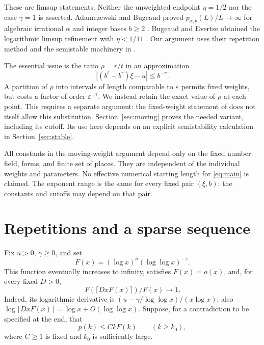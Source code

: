 \documentclass[11pt]{article}
\numberwithin{equation}{section}
\theoremstyle{remark}\newtheorem{remark}[theorem]{Remark}
\newcommand{\eps}{\varepsilon}\newcommand{\LL}{\mathcal L}
\begin{document}
These are limsup statements. Neither the unweighted endpoint
$\eta=1/2$ nor the case $\gamma=1$ is asserted.
Adamczewski and Bugeaud proved $p_{\alpha,b}(L)/L\to\infty$ for algebraic
irrational $\alpha$ and integer bases $b\ge2$ \cite{AB07}.
Bugeaud and Evertse obtained the logarithmic limsup refinement with
$\eta<1/11$ \cite[Theorem~2.1]{BE08}. Our argument uses their
repetition method and the semistable machinery in \cite[Sections~8--14]{EF13}.

The essential issue is the ratio $\rho=r/t$ in an approximation
\[
 |(b^t-b^r)\xi-a|\le b^{-v}.
\]
A partition of $\rho$ into intervals of length comparable to $\eps$
permits fixed weights, but costs a factor of order $\eps^{-1}$.
We instead retain the exact value of $\rho$ at each point. This requires
a separate argument: the fixed-weight statement of
\cite[Theorem~8.1]{EF13} does not itself allow this substitution.
Section~\ref{sec:moving} proves the needed variant, including its cutoff.
Its use here depends on an explicit semistability calculation in
Section~\ref{sec:stable}.

All constants in the moving-weight argument depend only on the fixed
number field, forms, and finite set of places. They are independent of
the individual weights and parameters. No effective numerical starting
length for \eqref{eq:main} is claimed. The exponent range is the same
for every fixed pair $(\xi,b)$; the constants and cutoffs may depend
on that pair.

\section{Repetitions and a sparse sequence}\label{sec:words}
Fix $u>0$, $\gamma\ge0$, and set
\[
 F(x)=(\log x)^u(\log\log x)^{-\gamma}.
\]
This function eventually increases to infinity, satisfies $F(x)=o(x)$,
and, for every fixed $D>0$,
\begin{equation}\label{eq:slow}
 F(\lceil DxF(x)\rceil)/F(x)\longrightarrow1.
\end{equation}
Indeed, its logarithmic derivative is
$(u-\gamma/\log\log x)/(x\log x)$; also
$\log\lceil DxF(x)\rceil=\log x+O(\log\log x)$.
Suppose, for a contradiction to be specified at the end, that
\begin{equation}\label{eq:LC}
 p(k)\le CkF(k)\qquad(k\ge k_0),
\end{equation}
where $C\ge1$ is fixed and $k_0$ is sufficiently large.
\end{document}

